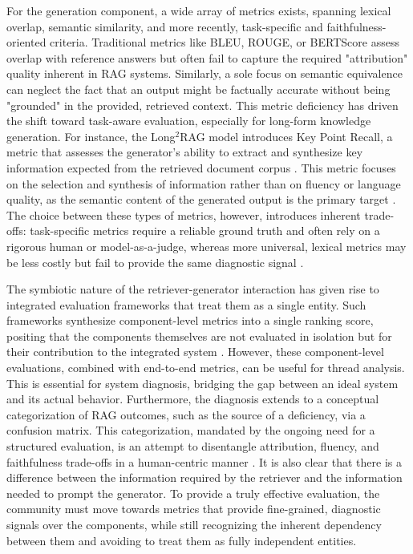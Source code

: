 \documentclass[11pt,a4paper]{article}
\begin{document}
For the generation component, a wide array of metrics exists, spanning lexical overlap, semantic similarity, and more recently, task-specific and faithfulness-oriented criteria. Traditional metrics like BLEU, ROUGE, or BERTScore assess overlap with reference answers but often fail to capture the required "attribution" quality inherent in RAG systems. Similarly, a sole focus on semantic equivalence can neglect the fact that an output might be factually accurate without being "grounded" in the provided, retrieved context. This metric deficiency has driven the shift toward task-aware evaluation, especially for long-form knowledge generation. For instance, the Long$^{2}$RAG model introduces Key Point Recall, a metric that assesses the generator's ability to extract and synthesize key information expected from the retrieved document corpus \cite{arxiv:2312.10997v5}. This metric focuses on the selection and synthesis of information rather than on fluency or language quality, as the semantic content of the generated output is the primary target \cite{arxiv:2506.20051v2}. The choice between these types of metrics, however, introduces inherent trade-offs: task-specific metrics require a reliable ground truth and often rely on a rigorous human or model-as-a-judge, whereas more universal, lexical metrics may be less costly but fail to provide the same diagnostic signal \cite{arxiv:2405.07437v2}.

The symbiotic nature of the retriever-generator interaction has given rise to integrated evaluation frameworks that treat them as a single entity. Such frameworks synthesize component-level metrics into a single ranking score, positing that the components themselves are not evaluated in isolation but for their contribution to the integrated system \cite{arxiv:2501.13958v3}. However, these component-level evaluations, combined with end-to-end metrics, can be useful for thread analysis. This is essential for system diagnosis, bridging the gap between an ideal system and its actual behavior. Furthermore, the diagnosis extends to a conceptual categorization of RAG outcomes, such as the source of a deficiency, via a confusion matrix. This categorization, mandated by the ongoing need for a structured evaluation, is an attempt to disentangle attribution, fluency, and faithfulness trade-offs in a human-centric manner \cite{arxiv:2405.07437v2}. It is also clear that there is a difference between the information required by the retriever and the information needed to prompt the generator. To provide a truly effective evaluation, the community must move towards metrics that provide fine-grained, diagnostic signals over the components, while still recognizing the inherent dependency between them and avoiding to treat them as fully independent entities.
\end{document}
